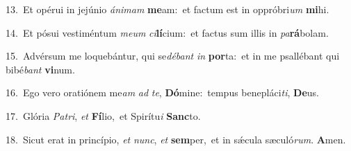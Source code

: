 {\numbfont\textcolor{\numbcolor}{13.}}~Et opérui in jejúnio \textit{á}\-\textit{ni}\textit{mam} \textbf{me}\-am:~\star et factum est in oppróbri\textit{um} \textbf{mi}\-hi.\par
{\numbfont\textcolor{\numbcolor}{14.}}~Et pósui vestiméntum \textit{me}\-\textit{um} \textit{ci}\-\textbf{lí}cium:~\star et factus sum illis in \textit{pa}\-\textbf{rá}bolam.\par
{\numbfont\textcolor{\numbcolor}{15.}}~Advérsum me loquebántur, qui se\-\textit{dé}\-\textit{bant} \textit{in} \textbf{por}\-ta:~\star et in me psallébant qui bibé\textit{bant} \textbf{vi}\-num.\par
{\numbfont\textcolor{\numbcolor}{16.}}~Ego vero oratiónem me\textit{am} \textit{ad} \textit{te}\-, \textbf{Dó}\-mine:~\star tempus benepláci\-\textit{ti}\-, \textbf{De}\-us.\par
{\numbfont\textcolor{\numbcolor}{17.}}~Glória \textit{Pa}\-\textit{tri}, \textit{et} \textbf{Fí}\-lio,~\star et Spirítu\textit{i} \textbf{Sanc}\-to.\par
{\numbfont\textcolor{\numbcolor}{18.}}~Sicut erat in princípio, \textit{et} \textit{nunc}\-, \textit{et} \textbf{sem}\-per,~\star et in sǽcula sæculó\-\textit{rum}\-. \textbf{A}\-men.\par
